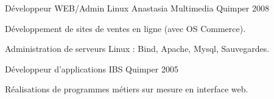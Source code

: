 \begin{cventries}
    \cventry
    {Développeur WEB/Admin Linux} %
    {Anastasia Multimedia} %
    {Quimper} %
    {2008} %
    {
      \begin{cvitems} %
        \item {Développement de sites de ventes en ligne (avec OS Commerce).}
        \item {Administration de serveurs Linux : Bind, Apache, Mysql, Sauvegardes.}
      \end{cvitems}
    }
    \cventry
    {Développeur d'applications} %
    {IBS} %
    {Quimper} %
    {2005} %
    {
        \begin{cvitems} %
          \item {Réalisations de programmes métiers sur mesure en interface web.}
        \end{cvitems}
    }


\end{cventries}
